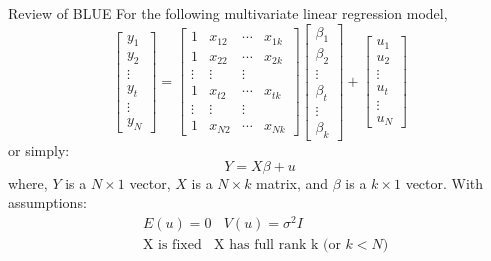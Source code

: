 \documentclass[aspectratio=169, t]{beamer}
\begin{document}
\begin{frame}{Review of BLUE}
    For the following multivariate linear regression model,
    \begin{equation*}
        \begin{bmatrix}
            y_1 \\
            y_2 \\
            \vdots \\
            y_t \\
            \vdots  \\ 
            y_N
        \end{bmatrix} = \begin{bmatrix}
            1 & x_{12} & \cdots & x_{1k} \\
            1 & x_{22} & \cdots & x_{2k} \\
            \vdots & \vdots & \vdots \\
            1 & x_{t2} & \cdots & x_{tk} \\ 
            \vdots & \vdots & \vdots \\
            1 & x_{N2} & \cdots & x_{Nk} 
        \end{bmatrix} \begin{bmatrix}
            \beta_1 \\ 
            \beta_2 \\
            \vdots \\
            \beta_t \\ 
            \vdots \\
            \beta_k
        \end{bmatrix} + \begin{bmatrix}
            u_1 \\
            u_2 \\
            \vdots \\
            u_t \\
            \vdots  \\ 
            u_N
        \end{bmatrix}
    \end{equation*} 
    or simply:
    \begin{equation}
        Y = X \beta + u 
    \end{equation}
    where, $Y$ is a $N \times 1$ vector, $X$ is a $N \times k$ matrix, and 
    $\beta$ is a $k \times 1$ vector. 
    With assumptions:
    \begin{align*}
        & E(u)  = 0 \ \ \ \ 
        V(u)  = \sigma^2 I \\ 
        & \text{X is fixed} \ \ \ \ 
        \text{X  has full rank k (or $k < N$)} 
    \end{align*}
\end{frame}
\end{document}
